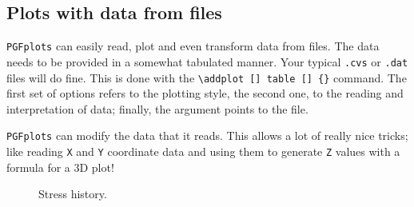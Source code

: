 \subsection{Plots with data from files}

\texttt{PGFplots} can easily read, plot and even transform data from files. The data needs to be provided in a somewhat tabulated manner. Your typical \texttt{.cvs} or \texttt{.dat} files will do fine. This is done with the \verb|\addplot [] table [] {}| command. The first set of options refers to the plotting style, the second one, to the reading and interpretation of data; finally, the argument points to the file.

\texttt{PGFplots} can modify the data that it reads. This allows a lot of really nice tricks; like reading \texttt{X} and \texttt{Y} coordinate data and using them to generate \texttt{Z} values with a formula for a 3D plot!

\begin{figure}[h]
	\centering
	\caption{Stress history.}
	\label{fig:stress-evolution}
\end{figure}

